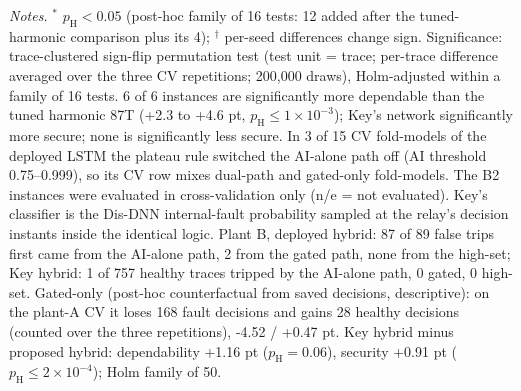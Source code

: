 \begin{table}[!htbp]
\vspace{3pt}\par\raggedright\scriptsize\textit{Notes.} $^{*}$ $p_{\mathrm{H}}<0.05$ (post-hoc family of 16 tests: 12 added after the tuned-harmonic comparison plus its 4); $^{\dagger}$ per-seed differences change sign. Significance: trace-clustered sign-flip permutation test (test unit = trace; per-trace difference averaged over the three CV repetitions; 200{,}000 draws), Holm-adjusted within a family of 16 tests. 6 of 6 instances are significantly more dependable than the tuned harmonic 87T (+2.3 to +4.6 pt, $p_{\mathrm{H}}\le1\times10^{-3}$); Key's network significantly more secure; none is significantly less secure. In 3 of 15 CV fold-models of the deployed LSTM the plateau rule switched the AI-alone path off (AI threshold 0.75--0.999), so its CV row mixes dual-path and gated-only fold-models. The B2 instances were evaluated in cross-validation only (n/e = not evaluated). Key's classifier is the Dis-DNN internal-fault probability sampled at the relay's decision instants inside the identical logic. Plant B, deployed hybrid: 87 of 89 false trips first came from the AI-alone path, 2 from the gated path, none from the high-set; Key hybrid: 1 of 757 healthy traces tripped by the AI-alone path, 0 gated, 0 high-set. Gated-only (post-hoc counterfactual from saved decisions, descriptive): on the plant-A CV it loses 168 fault decisions and gains 28 healthy decisions (counted over the three repetitions), -4.52 / +0.47 pt. Key hybrid minus proposed hybrid: dependability +1.16 pt ($p_{\mathrm{H}}=0.06$), security +0.91 pt ($p_{\mathrm{H}}\le2\times10^{-4}$); Holm family of 50.
\end{table}